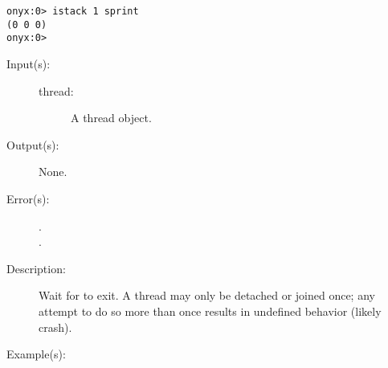 \begin{description}
\begin{description}
\begin{verbatim}
onyx:0> istack 1 sprint
(0 0 0)
onyx:0>
		\end{verbatim}
	\end{description}
\label{systemdict:join}
\item[{\onyxop{thread}{join}{--}}: ]
	\begin{description}\item[]
	\item[Input(s): ]
		\begin{description}\item[]
		\item[thread: ]
			A thread object.
		\end{description}
	\item[Output(s): ] None.
	\item[Error(s): ]
		\begin{description}\item[]
		\item[.]
		\item[.]
		\end{description}
	\item[Description: ]
		Wait for  to exit.  A thread may only be detached
		or joined once; any attempt to do so more than once results in
		undefined behavior (likely crash).
	\item[Example(s): ]\begin{verbatim}


\end{verbatim}
\end{description}
\end{description}
